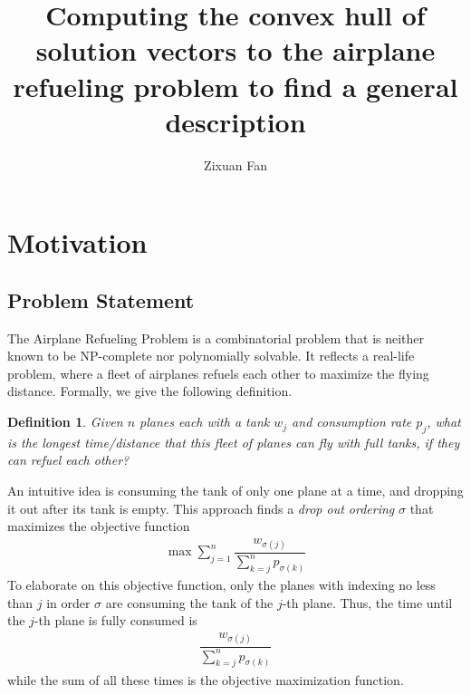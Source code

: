 \documentclass[12pt,letterpaper]{article}
\title{Computing the convex hull of solution vectors to the airplane refueling problem to find a general description}
\author{Zixuan Fan}
\newtheorem{definition}[theorem]{Definition}
\begin{document}
\maketitle

\section{Motivation}

\subsection{Problem Statement}
The Airplane Refueling Problem is a combinatorial problem that is 
neither known to be NP-complete nor polynomially solvable. 
It reflects a real-life problem, where a fleet of airplanes refuels each other 
to maximize the flying distance. Formally, we give the following definition. 
\begin{definition}
 Given $n$ planes each with a tank $w_j$ and consumption rate $p_j$,
 what is the longest time/distance that this fleet of planes can fly with full tanks,
 if they can refuel each other?
\end{definition}
An intuitive idea is consuming the tank of only one plane 
at a time, and dropping it out after its tank is empty. This approach 
finds a \textit{drop out ordering} $\sigma$
that maximizes the objective function 
\begin{align*}
    \max \sum_{j=1}^{n} \dfrac{w_{\sigma(j)}}{\sum_{k = j}^n p_{\sigma(k)}}
\end{align*}
To elaborate on this objective function, only the planes with indexing no less than $j$ in order $\sigma$
are consuming the tank of the $j$-th plane. Thus, the time until the $j$-th plane is fully consumed is 
\begin{align*}
    \dfrac{w_{\sigma(j)}}{\sum_{k = j}^n p_{\sigma(k)}}
\end{align*}
while the sum of all these times is the objective maximization function.
\end{document}
